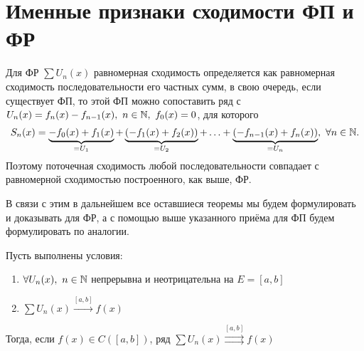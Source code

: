 \documentclass[../../main.tex]{subfiles}
\begin{document}
\section{Именные признаки сходимости ФП и ФР}

Для ФР $\sum U_n(x)$ равномерная сходимость определяется как 
равномерная сходимость последовательности его частных сумм, в свою очередь,
если существует ФП, то этой ФП можно сопоставить ряд с 
$U_n(x) = f_n(x) - f_{n-1}(x),\ n \in \mathbb{N},\ f_0(x) = 0$, для которого
\[
S_n(x) = \underbrace{-f_0(x) + f_1(x)}_{= U_1} + 
\underbrace{(-f_1(x) + f_2(x))}_{= U_2} + \ldots +
\underbrace{(-f_{n-1}(x) + f_n(x))}_{= U_n},\ \forall n \in \mathbb{N}.	
\]
Поэтому поточечная сходимость любой последовательности совпадает с 
равномерной сходимостью построенного, как выше, ФР.

В связи с этим в дальнейшем все оставшиеся теоремы мы будем формулировать
и доказывать для ФР, а с помощью выше указанного приёма для ФП будем
формулировать по аналогии.

\begin{thm}
Пусть выполнены условия:

	\begin{enumerate}
		\item $\forall U_n(x),\ n \in \mathbb{N}$ непрерывна и неотрицательна на
	$E=[a,b]$
		\item $\sum U_n(x) \overset{[a,b]}{\longrightarrow} f(x)$
	\end{enumerate}
Тогда, если $f(x) \in C([a,b])$, ряд 
$\sum U_n(x) \overset{[a,b]}{\rightrightarrows} f(x)$
\end{thm}	
\end{document}
